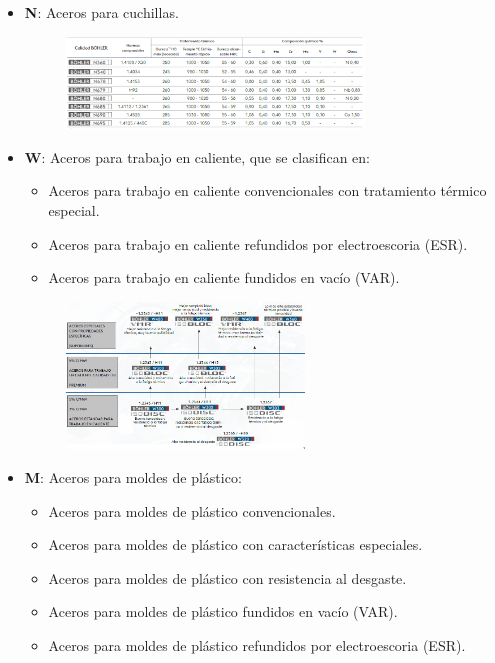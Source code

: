 \documentclass[12pt,a4paper]{article}
\begin{document}
\begin{itemize}
    \item \textbf{N}: Aceros para cuchillas.
    \begin{figure}[H]    
        \centering         
        \includegraphics[width=0.75\textwidth]{Inagenes para latex/3.png}
    \end{figure}
    \item \textbf{W}: Aceros para trabajo en caliente, que se clasifican en:
    \begin{itemize}
        \item Aceros para trabajo en caliente convencionales con tratamiento térmico especial.
        \item Aceros para trabajo en caliente refundidos por electroescoria (ESR).
        \item Aceros para trabajo en caliente fundidos en vacío (VAR).
    \end{itemize}
    \begin{figure}[H]    
        \centering         
        \includegraphics[width=0.6\textwidth]{Inagenes para latex/4.png}
    \end{figure}
    \item \textbf{M}: Aceros para moldes de plástico:
    \begin{itemize}
        \item Aceros para moldes de plástico convencionales.
        \item Aceros para moldes de plástico con características especiales.
        \item Aceros para moldes de plástico con resistencia al desgaste.
        \item Aceros para moldes de plástico fundidos en vacío (VAR).
        \item Aceros para moldes de plástico refundidos por electroescoria (ESR).

\end{itemize}
\end{itemize}
\end{document}
